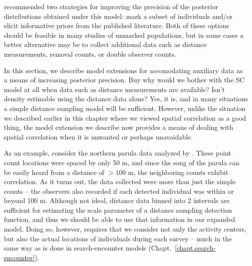 \citet{chandler_royle:2012} recommended two strategies for improving
the precision of the posterior distributions obtained under this
model: mark a subset of individuals and/or elicit informative
priors from the published literature. Both of these options should be
feasible in many studies of unmarked populations, but in some cases a
better alternative may be to collect
additional data %
such as
distance measurements, %
removal counts, or %
double observer counts.

In this section, we describe model extensions for accomodating
auxiliary data as a means of increasing posterior precision. Buy why
would we bother with the SC model at all when data
such as distance measurements are available? Isn't density estimable
using the distance data alone? Yes, it is, and in many situations a
simple distance sampling model will be sufficient. However, unlike the
situation we described earlier in this chapter where we viewed spatial
correlation as a good thing, the model extension we describe now
provides a means of dealing with spatial correlation when it is
unwanted or perhaps unavoidable.

As an example, consider the northern parula data analyzed by
\citet{chandler_royle:2012}. These point count locations were spaced
by only 50 m, and since the song of the parula can be easily heard
from a distance of $>100$ m, the neighboring counts exhibit
correlation. As it turns out, the data collected were more than just
the simple counts -- the observers also recorded if each detected
individual was within or beyond 100 m. Although not ideal, distance
data binned into 2 intervals are sufficient for estimating the scale
parameter of a distance sampling detection function, and thus we
should be able to use that information in our expanded model. Doing
so, however, requires that we consider not only the activity centers,
but also the actual locations of individuals during each survey --
much in the same way as is done in search-encounter models
(Chapt.~\ref{chapt.search-encounter}). %

